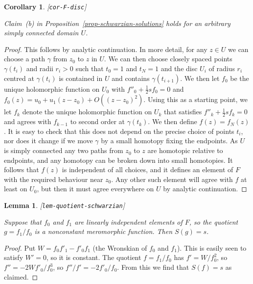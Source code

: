 \documentclass[reqno]{amsart}
\newcommand{\lbl}[1]{\label{#1}\textup{[\texttt{#1}]}\par}
\newcommand{\lbl}{\label}
\newcommand{\gm}        {\gamma}
\newcommand{\half}      {\tfrac{1}{2}}
\renewcommand{\:}{\colon}
\newtheorem{lemma}[theorem]{Lemma}
\newtheorem{corollary}[theorem]{Corollary}
\theoremstyle{definition}
\begin{document}
\begin{corollary}\lbl{cor-F-disc}
 Claim~(b) in Proposition~\ref{prop-schwarzian-solutions} holds for
 an arbitrary simply connected domain $U$.
\end{corollary}
\begin{proof}
 This follows by analytic continuation.  In more detail, for any
 $z\in U$ we can choose a path $\gm$ from $z_0$ to $z$ in $U$.  We can
 then choose closely spaced points $\gm(t_i)$ and radii $r_i>0$ such
 that $t_0=1$ and $t_N=1$ and the disc $U_i$ of radius $r_i$ centred
 at $\gm(t_i)$ is contained in $U$ and contains $\gm(t_{i+1})$.  We
 then let $f_0$ be the unique holomorphic function on $U_0$ with
 $f''_0+\half sf_0=0$ and $f_0(z)=u_0+u_1(z-z_0)+O((z-z_0)^2)$.  Using
 this as a starting point, we let $f_k$ denote the unique holomorphic
 function on $U_k$ that satisfies $f''_k+\half sf_k=0$ and agrees with
 $f_{k-1}$ to second order at $\gm(t_k)$.  We then define
 $f(z)=f_N(z)$.  It is easy to check that this does not depend on the
 precise choice of points $t_i$, nor does it change if we move $\gm$
 by a small homotopy fixing the endpoints.  As $U$ is simply connected
 any two paths from $z_0$ to $z$ are homotopic relative to endpoints,
 and any homotopy can be broken down into small homotopies.  It
 follows that $f(z)$ is independent of all choices, and it defines an
 element of $F$ with the required behaviour near $z_0$.  Any other
 such element will agree with $f$ at least on $U_0$, but then it must
 agree everywhere on $U$ by analytic continuation.
\end{proof}

\begin{lemma}\lbl{lem-quotient-schwarzian}
 Suppose that $f_0$ and $f_1$ are linearly independent elements of
 $F$, so the quotient $g=f_1/f_0$ is a nonconstant meromorphic
 function.  Then $S(g)=s$.
\end{lemma}
\begin{proof}
 Put $W=f_0f'_1-f'_0f_1$ (the Wronskian of $f_0$ and $f_1$).  This is
 easily seen to satisfy $W'=0$, so it is constant.  The quotient
 $f=f_1/f_0$ has $f'=W/f_0^2$, so $f''=-2Wf'_0/f_0^3$, so
 $f''/f'=-2f'_0/f_0$.  From this we find that $S(f)=s$ as claimed.
\end{proof}
\end{document}
